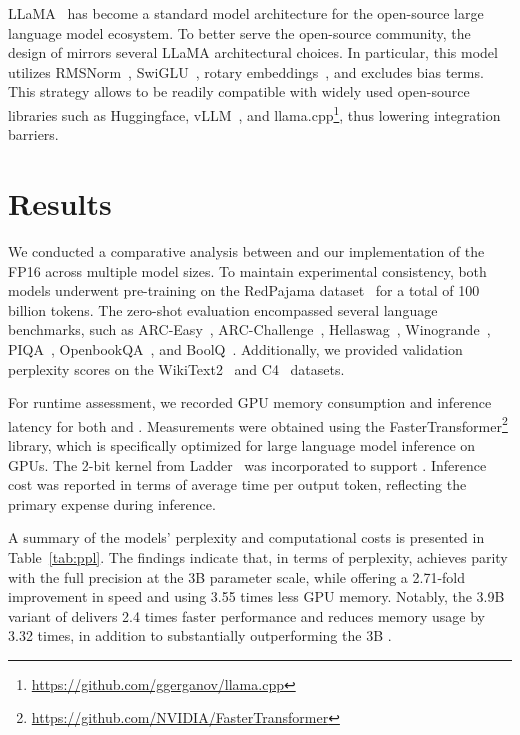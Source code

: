LLaMA~\cite{llama, llama2} has become a standard model architecture for the open-source large language model ecosystem. To better serve the open-source community, the design of  mirrors several LLaMA architectural choices. In particular, this model utilizes RMSNorm~\cite{rmsnorm}, SwiGLU~\cite{swiglu}, rotary embeddings~\cite{rope}, and excludes bias terms. This strategy allows  to be readily compatible with widely used open-source libraries such as Huggingface, vLLM~\cite{vllm}, and llama.cpp\footnote{\url{https://github.com/ggerganov/llama.cpp}}, thus lowering integration barriers.

\section{Results}

We conducted a comparative analysis between  and our implementation of the FP16  across multiple model sizes. To maintain experimental consistency, both models underwent pre-training on the RedPajama dataset~\cite{redpajama} for a total of 100 billion tokens. The zero-shot evaluation encompassed several language benchmarks, such as ARC-Easy~\cite{arc}, ARC-Challenge~\cite{arc}, Hellaswag~\cite{hellaswag}, Winogrande~\cite{winoGrande}, PIQA~\cite{piqa}, OpenbookQA~\cite{openbookqa}, and BoolQ~\cite{boolq}. Additionally, we provided validation perplexity scores on the WikiText2~\cite{wikitext2} and C4~\cite{c4} datasets.

For runtime assessment, we recorded GPU memory consumption and inference latency for both  and . Measurements were obtained using the FasterTransformer\footnote{\url{https://github.com/NVIDIA/FasterTransformer}} library, which is specifically optimized for large language model inference on GPUs. The 2-bit kernel from Ladder~\cite{ladder} was incorporated to support . Inference cost was reported in terms of average time per output token, reflecting the primary expense during inference.

A summary of the models' perplexity and computational costs is presented in Table~\ref{tab:ppl}. The findings indicate that, in terms of perplexity,  achieves parity with the full precision  at the 3B parameter scale, while offering a 2.71-fold improvement in speed and using 3.55 times less GPU memory. Notably, the 3.9B variant of  delivers 2.4 times faster performance and reduces memory usage by 3.32 times, in addition to substantially outperforming the 3B .

